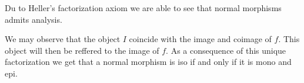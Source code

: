     \begin{remark}
        Du to Heller's factorization axiom we are able to see that normal morphisms admits analysis.

        \begin{center}
        \end{center}

        We may observe that the object $I$ coincide with the image and coimage of $f$. This object will then be reffered to the image of $f$. As a consequence of this unique factorization we get that a normal morphism is iso if and only if it is mono and epi.
    \end{remark}

